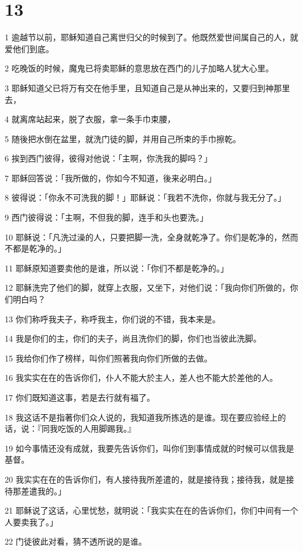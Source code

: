 \chapter{13}

\par 1 逾越节以前，耶稣知道自己离世归父的时候到了。他既然爱世间属自己的人，就爱他们到底。
\par 2 吃晚饭的时候，魔鬼已将卖耶稣的意思放在西门的儿子加略人犹大心里。
\par 3 耶稣知道父已将万有交在他手里，且知道自己是从神出来的，又要归到神那里去，
\par 4 就离席站起来，脱了衣服，拿一条手巾束腰，
\par 5 随後把水倒在盆里，就洗门徒的脚，并用自己所束的手巾擦乾。
\par 6 挨到西门彼得，彼得对他说：「主啊，你洗我的脚吗？」
\par 7 耶稣回答说：「我所做的，你如今不知道，後来必明白。」
\par 8 彼得说：「你永不可洗我的脚！」耶稣说：「我若不洗你，你就与我无分了。」
\par 9 西门彼得说：「主啊，不但我的脚，连手和头也要洗。」
\par 10 耶稣说：「凡洗过澡的人，只要把脚一洗，全身就乾净了。你们是乾净的，然而不都是乾净的。」
\par 11 耶稣原知道要卖他的是谁，所以说：「你们不都是乾净的。」
\par 12 耶稣洗完了他们的脚，就穿上衣服，又坐下，对他们说：「我向你们所做的，你们明白吗？
\par 13 你们称呼我夫子，称呼我主，你们说的不错，我本来是。
\par 14 我是你们的主，你们的夫子，尚且洗你们的脚，你们也当彼此洗脚。
\par 15 我给你们作了榜样，叫你们照著我向你们所做的去做。
\par 16 我实实在在的告诉你们，仆人不能大於主人，差人也不能大於差他的人。
\par 17 你们既知道这事，若是去行就有福了。
\par 18 我这话不是指著你们众人说的，我知道我所拣选的是谁。现在要应验经上的话，说：『同我吃饭的人用脚踢我。』
\par 19 如今事情还没有成就，我要先告诉你们，叫你们到事情成就的时候可以信我是基督。
\par 20 我实实在在的告诉你们，有人接待我所差遣的，就是接待我；接待我，就是接待那差遣我的。」
\par 21 耶稣说了这话，心里忧愁，就明说：「我实实在在的告诉你们，你们中间有一个人要卖我了。」
\par 22 门徒彼此对看，猜不透所说的是谁。
